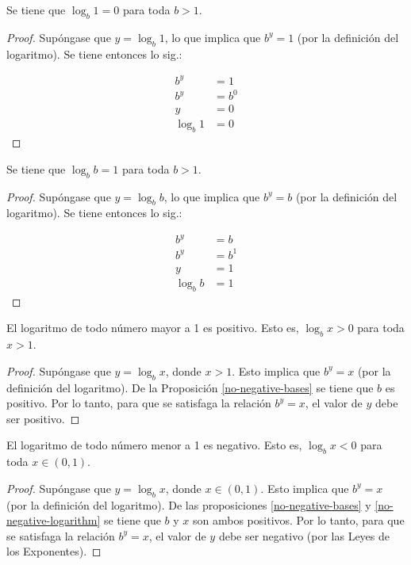 \begin{prop}
    Se tiene que $\log_{b}1=0$ para toda $b>1$.
\end{prop}
\begin{proof}
    Supóngase que $y=\log_{b}1$, lo que implica que $b^{y}=1$ (por la
    definición del logaritmo). Se tiene entonces lo sig.:

    \begin{align*}
        b^{y} &= 1\\
        b^{y} &= b^{0}\\
        y &= 0\\
        \log_{b}1 &= 0
    \end{align*}
\end{proof}

\begin{prop}
    Se tiene que $\log_{b}b=1$ para toda $b>1$.
\end{prop}
\begin{proof}
    Supóngase que $y=\log_{b}b$, lo que implica que $b^{y}=b$ (por la
    definición del logaritmo). Se tiene entonces lo sig.:

    \begin{align*}
        b^{y} &= b\\
        b^{y} &= b^{1}\\
        y &= 1\\
        \log_{b}b &= 1
    \end{align*}
\end{proof}

\begin{prop}
    El logaritmo de todo número mayor a 1 es positivo. Esto es, $\log_{b}x>0$
    para toda $x>1$.
\end{prop}
\begin{proof}
    Supóngase que $y=\log_{b}x$, donde $x>1$. Esto implica que $b^{y}=x$
    (por la definición del logaritmo). De la Proposición \ref{no-negative-bases}
    se tiene que $b$ es positivo. Por lo tanto, para que se satisfaga
    la relación $b^{y}=x$, el valor de $y$ debe ser positivo. 
\end{proof}

\begin{prop}
    El logaritmo de todo número menor a 1 es negativo. Esto es, $\log_{b}x<0$
    para toda $x\in(0,1)$.
\end{prop}
\begin{proof}
    Supóngase que $y=\log_{b}x$, donde $x\in(0,1)$. Esto implica que
    $b^{y}=x$ (por la definición del logaritmo). De las proposiciones
    \ref{no-negative-bases} y \ref{no-negative-logarithm} se tiene que
    $b$ y $x$ son ambos positivos. Por lo tanto, para que se satisfaga
    la relación $b^{y}=x$, el valor de $y$ debe ser negativo (por las
    Leyes de los Exponentes).
\end{proof}

